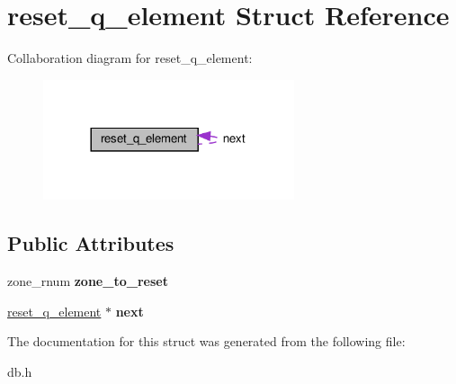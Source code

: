 \hypertarget{structreset__q__element}{}\section{reset\+\_\+q\+\_\+element Struct Reference}
\label{structreset__q__element}


Collaboration diagram for reset\+\_\+q\+\_\+element\+:\nopagebreak
\begin{figure}[H]
\begin{center}
\leavevmode
\includegraphics[width=209pt]{structreset__q__element__coll__graph}
\end{center}
\end{figure}
\subsection*{Public Attributes}
\begin{DoxyCompactItemize}
\item 
\mbox{\label{structreset__q__element_ae66137cf094bfcd9a9f65124385ca7e9}} 
zone\+\_\+rnum {\bfseries zone\+\_\+to\+\_\+reset}
\item 
\mbox{\label{structreset__q__element_a72e569fcd97b41bfff3dde5ca6a74bde}} 
\hyperlink{structreset__q__element}{reset\+\_\+q\+\_\+element} $\ast$ {\bfseries next}
\end{DoxyCompactItemize}


The documentation for this struct was generated from the following file\+:\begin{DoxyCompactItemize}
\item 
db.\+h\end{DoxyCompactItemize}
